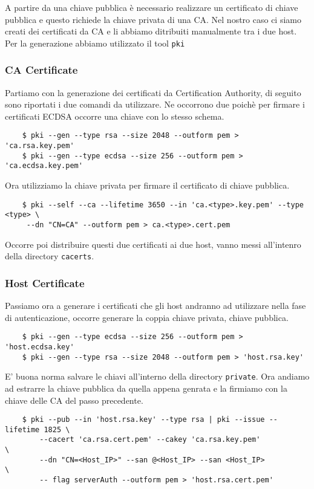 \documentclass[
10pt, %
a4paper, %
oneside, %
headinclude,footinclude, %
BCOR5mm, %
]{scrartcl}
\begin{document}
\noindent
A partire da una chiave pubblica è necessario realizzare un certificato di chiave pubblica e questo richiede la chiave privata di una CA. 
Nel nostro caso ci siamo creati dei certificati da CA e li abbiamo ditribuiti manualmente tra i due host. \\

\noindent
Per la generazione abbiamo utilizzato il tool \lstinline|pki|

\subsubsection*{CA Certificate}
Partiamo con la generazione dei certificati da Certification Authority, di seguito sono riportati i due comandi da utilizzare. Ne occorrono due poichè per firmare
i certificati ECDSA occorre una chiave con lo stesso schema.
\begin{lstlisting}
    $ pki --gen --type rsa --size 2048 --outform pem > 'ca.rsa.key.pem'
    $ pki --gen --type ecdsa --size 256 --outform pem > 'ca.ecdsa.key.pem'
\end{lstlisting} 

\noindent
Ora utilizziamo la chiave privata per firmare il certificato di chiave pubblica.
\begin{lstlisting}
    $ pki --self --ca --lifetime 3650 --in 'ca.<type>.key.pem' --type <type> \
     --dn "CN=CA" --outform pem > ca.<type>.cert.pem
\end{lstlisting}

\noindent
Occorre poi distribuire questi due certificati ai due host, vanno messi all'intenro della directory \lstinline|cacerts|.

\subsubsection*{Host Certificate}
Passiamo ora a generare i certificati che gli host andranno ad utilizzare nella fase di autenticazione, occorre generare la coppia chiave privata, chiave pubblica.
\begin{lstlisting}
    $ pki --gen --type ecdsa --size 256 --outform pem > 'host.ecdsa.key'
    $ pki --gen --type rsa --size 2048 --outform pem > 'host.rsa.key'
\end{lstlisting} 

\noindent
E' buona norma salvare le chiavi all'interno della directory \lstinline|private|. Ora andiamo ad estrarre la chiave pubblica 
da quella appena genrata e la firmiamo con la chiave delle CA del passo precedente.
\begin{lstlisting}
    $ pki --pub --in 'host.rsa.key' --type rsa | pki --issue --lifetime 1825 \
        --cacert 'ca.rsa.cert.pem' --cakey 'ca.rsa.key.pem'                  \
        --dn "CN=<Host_IP>" --san @<Host_IP> --san <Host_IP>                 \
        -- flag serverAuth --outform pem > 'host.rsa.cert.pem'
\end{lstlisting}
\end{document}
